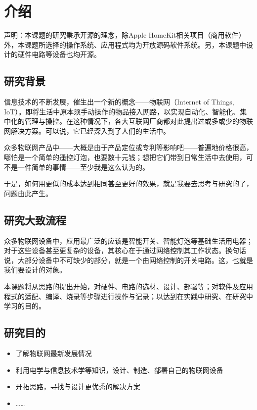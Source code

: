\setchapterpreamble[u]{\margintoc}
\chapter{介绍}

声明：本课题的研究秉承开源的理念，除Apple HomeKit相关项目（商用软件）外，本课题所选择的操作系统、应用程式均为开放源码软件系统。另，本课题中设计的硬件电路等设备也均开源。

\section{研究背景}
\setlength\parindent{2em} 信息技术的不断发展，催生出一个新的概念——物联网（Internet of Things, IoT）。即将生活中原本须手动操作的物品接入网路，以实现自动化、智能化、集中化的管理与操控。在这种情况下，各大互联网厂商都对此提出过或多或少的物联网解决方案。可以说，它已经深入到了人们的生活中。
\par 众多物联网产品中——大概是由于产品定位或专利等影响吧——普遍地价格很高，哪怕是一个简单的遥控灯泡，也要数十元钱；想把它们带到日常生活中去使用，可不是一件简单的事情——至少我是这么认为的。
\par 于是，如何用更低的成本达到相同甚至更好的效果，就是我要去思考与研究的了，问题由此产生。

\section{研究大致流程}
\par 众多物联网设备中，应用最广泛的应该是智能开关、智能灯泡等基础生活用电器；对于这些设备甚至更复杂的设备，其核心在于通过网络控制其工作状态。换句话说，大部分设备中不可缺少的部分，就是一个由网络控制的开关电路。这，也就是我们要设计的对象。
\par 本课题将从思路的提出开始，对硬件、电路的选材、设计、部署等；对软件及应用程式的适配、编译、烧录等步骤进行操作与记录；以达到在实践中研究、在研究中学习的目的。

\section{研究目的} 
\begin{itemize}
	\item 了解物联网最新发展情况
	\item 利用电学与信息技术学等知识，设计、制造、部署自己的物联网设备
	\item 开拓思路，寻找与设计更优秀的解决方案
	\item ……
\end{itemize}

